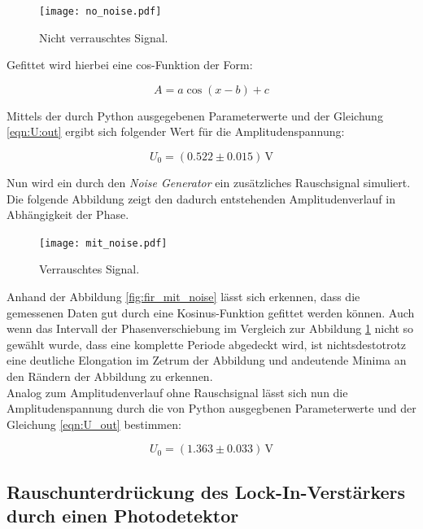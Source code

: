 \begin{figure}[H]
    \texttt{[image: no\_noise.pdf]}
    \caption{Nicht verrauschtes Signal.}
    \label{fig:fit_no_noise}
\end{figure}

\noindent
Gefittet wird hierbei eine cos-Funktion der Form:

\begin{equation*}
    A = a\cos(x - b) + c
\end{equation*}

\noindent Mittels der durch Python ausgegebenen Parameterwerte und der Gleichung \eqref{eqn:U:out} ergibt sich folgender Wert 
für die Amplitudenspannung:

\begin{equation*}
    U_0 = (0.522 \pm 0.015)\,\unit{\volt}
\end{equation*}

\noindent Nun wird ein durch den \emph{Noise Generator} ein zusätzliches Rauschsignal simuliert. Die folgende Abbildung zeigt den
dadurch entstehenden Amplitudenverlauf in Abhängigkeit der Phase.

\begin{figure}[H]
    \texttt{[image: mit\_noise.pdf]}
    \caption{Verrauschtes Signal.}
    \label{fig:fit_mit_noise}
\end{figure}

\noindent
Anhand der Abbildung \ref{fig:fir_mit_noise} lässt sich erkennen, dass die gemessenen Daten gut durch eine Kosinus-Funktion gefittet werden 
können. Auch wenn das Intervall der Phasenverschiebung im Vergleich zur Abbildung \ref{fig:fit_no_noise} nicht so gewählt 
wurde, dass eine komplette Periode abgedeckt wird, ist nichtsdestotrotz eine deutliche Elongation im Zetrum der Abbildung und 
andeutende Minima an den Rändern der Abbildung zu erkennen.\\
Analog zum Amplitudenverlauf ohne Rauschsignal lässt sich nun die Amplitudenspannung durch die von Python ausgegbenen Parameterwerte
und der Gleichung \eqref{eqn:U_out} bestimmen:

\begin{equation*}
    U_0 = (1.363 \pm 0.033)\,\unit{\volt}
\end{equation*}

\subsection{Rauschunterdrückung des Lock-In-Verstärkers durch einen Photodetektor}

